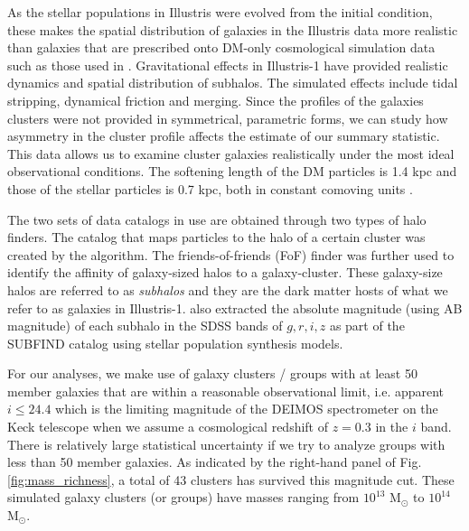 As the stellar populations in Illustris were evolved from the initial condition,
these makes the spatial distribution of galaxies in the Illustris data more 
realistic than galaxies that are prescribed onto DM-only cosmological
simulation data such as those used in \cite{Harvey2013d}.  
Gravitational effects in Illustris-1 have provided realistic dynamics and
spatial distribution of subhalos. The simulated effects include
tidal stripping, dynamical friction and merging. 
Since the profiles of the galaxies clusters were not
provided in symmetrical, parametric forms, we can study 
how asymmetry in the cluster profile affects the estimate of our summary 
statistic. This data allows us to examine cluster galaxies
realistically under the most ideal observational conditions. 
The softening length of the DM particles is
1.4 kpc and those of the stellar particles is 
0.7 kpc, both in constant comoving units \citep{Genel2014a}.

The two sets of data catalogs in use are obtained through two types of halo
finders. The catalog that maps particles to the halo of a certain cluster was 
created by the {} algorithm. The friends-of-friends (FoF) 
finder \citep{Davis1985} was further used to identify the affinity
of galaxy-sized halos to a galaxy-cluster. 
These galaxy-size halos are referred to as {\it subhalos} and 
they are the dark matter hosts of what we refer to as galaxies in Illustris-1. 
\cite{Vogelsberger2014a} also extracted the 
absolute magnitude (using AB magnitude) of each subhalo in
the SDSS bands of $g, r, i, z$ as part of the {\sc
SUBFIND} catalog using stellar population synthesis models.

For our analyses, we make use of galaxy clusters / groups 
with at least 50 member galaxies that are within a reasonable observational limit, 
i.e. apparent $i \leq 24.4$ which is the limiting magnitude of the DEIMOS
spectrometer on the Keck telescope when we assume a cosmological redshift of $z = 0.3$
in the $i$ band. %
There is relatively large statistical uncertainty if we try
to analyze groups with less than 50 member galaxies. 
As indicated by the right-hand panel of Fig. \ref{fig:mass_richness}, 
a total of 43 clusters has 
survived this magnitude cut. These simulated galaxy clusters (or groups) have 
masses ranging from $10^{13}$ M$_\odot $ to $10^{14}$ M$_\odot$.  

